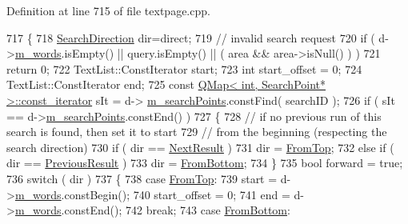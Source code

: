 Definition at line 715 of file textpage.\+cpp.


\begin{DoxyCode}
717 \{
718     \hyperlink{namespaceOkular_ad7ede3c5a1b1a8bfd83f133e7e3ed9d2}{SearchDirection} dir=direct;
719     \textcolor{comment}{// invalid search request}
720     \textcolor{keywordflow}{if} ( d->\hyperlink{classOkular_1_1TextPagePrivate_a36b703334a8775136cb4308209afd1cb}{m\_words}.isEmpty() || query.isEmpty() || ( area && area->isNull() ) )
721         \textcolor{keywordflow}{return} 0;
722     TextList::ConstIterator start;
723     \textcolor{keywordtype}{int} start\_offset = 0;
724     TextList::ConstIterator end;
725     \textcolor{keyword}{const} \hyperlink{classQMap}{QMap< int, SearchPoint* >::const\_iterator} sIt = d->
      \hyperlink{classOkular_1_1TextPagePrivate_a4cd8e4b3be609ba6f03c8c85963d7b6e}{m\_searchPoints}.constFind( searchID );
726     \textcolor{keywordflow}{if} ( sIt == d->\hyperlink{classOkular_1_1TextPagePrivate_a4cd8e4b3be609ba6f03c8c85963d7b6e}{m\_searchPoints}.constEnd() )
727     \{
728         \textcolor{comment}{// if no previous run of this search is found, then set it to start}
729         \textcolor{comment}{// from the beginning (respecting the search direction)}
730         \textcolor{keywordflow}{if} ( dir == \hyperlink{namespaceOkular_ad7ede3c5a1b1a8bfd83f133e7e3ed9d2ae206453ab991a0ffea7c198f8ef600c4}{NextResult} )
731             dir = \hyperlink{namespaceOkular_ad7ede3c5a1b1a8bfd83f133e7e3ed9d2a12e1e0d5fba44b6eb075863eb0992cf6}{FromTop};
732         \textcolor{keywordflow}{else} \textcolor{keywordflow}{if} ( dir == \hyperlink{namespaceOkular_ad7ede3c5a1b1a8bfd83f133e7e3ed9d2ad604ce7efcb1e2987d9503404f34a504}{PreviousResult} )
733             dir = \hyperlink{namespaceOkular_ad7ede3c5a1b1a8bfd83f133e7e3ed9d2a1a146d4130e3d6f0ad12fd5ee6fc3497}{FromBottom};
734     \}
735     \textcolor{keywordtype}{bool} forward = \textcolor{keyword}{true};
736     \textcolor{keywordflow}{switch} ( dir )
737     \{
738         \textcolor{keywordflow}{case} \hyperlink{namespaceOkular_ad7ede3c5a1b1a8bfd83f133e7e3ed9d2a12e1e0d5fba44b6eb075863eb0992cf6}{FromTop}:
739             start = d->\hyperlink{classOkular_1_1TextPagePrivate_a36b703334a8775136cb4308209afd1cb}{m\_words}.constBegin();
740             start\_offset = 0;
741             end = d->\hyperlink{classOkular_1_1TextPagePrivate_a36b703334a8775136cb4308209afd1cb}{m\_words}.constEnd();
742             \textcolor{keywordflow}{break};
743         \textcolor{keywordflow}{case} \hyperlink{namespaceOkular_ad7ede3c5a1b1a8bfd83f133e7e3ed9d2a1a146d4130e3d6f0ad12fd5ee6fc3497}{FromBottom}:

\end{DoxyCode}
